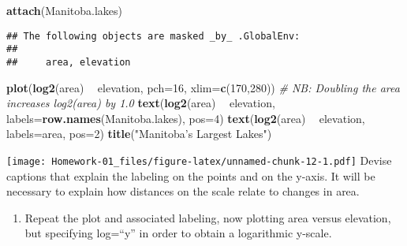 \documentclass[
]{article}
\newenvironment{Shaded}{\begin{snugshade}}{\end{snugshade}}
\newcommand{\CommentTok}[1]{\textcolor[rgb]{0.56,0.35,0.01}{\textit{#1}}}
\newcommand{\DataTypeTok}[1]{\textcolor[rgb]{0.13,0.29,0.53}{#1}}
\newcommand{\DecValTok}[1]{\textcolor[rgb]{0.00,0.00,0.81}{#1}}
\newcommand{\KeywordTok}[1]{\textcolor[rgb]{0.13,0.29,0.53}{\textbf{#1}}}
\newcommand{\NormalTok}[1]{#1}
\newcommand{\OperatorTok}[1]{\textcolor[rgb]{0.81,0.36,0.00}{\textbf{#1}}}
\newcommand{\StringTok}[1]{\textcolor[rgb]{0.31,0.60,0.02}{#1}}
\providecommand{\tightlist}{%
  \setlength{\itemsep}{0pt}\setlength{\parskip}{0pt}}
\begin{document}
\begin{Shaded}
\begin{Highlighting}[]
\KeywordTok{attach}\NormalTok{(Manitoba.lakes)}
\end{Highlighting}
\end{Shaded}

\begin{verbatim}
## The following objects are masked _by_ .GlobalEnv:
## 
##     area, elevation
\end{verbatim}

\begin{Shaded}
\begin{Highlighting}[]
\KeywordTok{plot}\NormalTok{(}\KeywordTok{log2}\NormalTok{(area) }\OperatorTok{~}\StringTok{ }\NormalTok{elevation, }\DataTypeTok{pch=}\DecValTok{16}\NormalTok{, }\DataTypeTok{xlim=}\KeywordTok{c}\NormalTok{(}\DecValTok{170}\NormalTok{,}\DecValTok{280}\NormalTok{))}
\CommentTok{# NB: Doubling the area increases log2(area) by 1.0}
\KeywordTok{text}\NormalTok{(}\KeywordTok{log2}\NormalTok{(area) }\OperatorTok{~}\StringTok{ }\NormalTok{elevation, }\DataTypeTok{labels=}\KeywordTok{row.names}\NormalTok{(Manitoba.lakes), }\DataTypeTok{pos=}\DecValTok{4}\NormalTok{)}
\KeywordTok{text}\NormalTok{(}\KeywordTok{log2}\NormalTok{(area) }\OperatorTok{~}\StringTok{ }\NormalTok{elevation, }\DataTypeTok{labels=}\NormalTok{area, }\DataTypeTok{pos=}\DecValTok{2}\NormalTok{) }
\KeywordTok{title}\NormalTok{(}\StringTok{"Manitoba’s Largest Lakes"}\NormalTok{)}
\end{Highlighting}
\end{Shaded}

\texttt{[image: Homework-01\_files/figure-latex/unnamed-chunk-12-1.pdf]}
Devise captions that explain the labeling on the points and on the
y-axis. It will be necessary to explain how distances on the scale
relate to changes in area.

\begin{enumerate}
\def\labelenumi{(\alph{enumi})}
\setcounter{enumi}{1}
\tightlist
\item
  Repeat the plot and associated labeling, now plotting area versus
  elevation, but specifying log=``y'' in order to obtain a logarithmic
  y-scale.
\end{enumerate}
\end{document}
